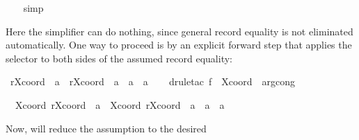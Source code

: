\begin{isabellebody}
%
\isadelimproof
\ \ %
\endisadelimproof
%
\isatagproof
{}\isamarkupfalse%
\ simp{}\isanewline
\ \ \isamarkupfalse%
%
\endisatagproof
{\isafoldproof}%
%
\isadelimproof
%
\endisadelimproof
%
\begin{isamarkuptext}%
\noindent
  Here the simplifier can do nothing, since general record equality is
  not eliminated automatically.  One way to proceed is by an explicit
  forward step that applies the selector  to both sides
  of the assumed record equality:%
\end{isamarkuptext}%
\isamarkuptrue%
\isamarkupfalse%
\ {}r{}Xcoord\ {}{}\ a{}\ {}\ r{}Xcoord\ {}{}\ a{}{}\ {}\ a\ {}\ a{}{}\isanewline
%
\isadelimproof
\ \ %
\endisadelimproof
%
\isatagproof
{}\isamarkupfalse%
\ {}drule{}tac\ f\ {}\ Xcoord\ \ arg{}cong{}%
\begin{isamarkuptxt}%
\begin{isabelle}%
\ {}{}\ Xcoord\ {}r{}Xcoord\ {}{}\ a{}{}\ {}\ Xcoord\ {}r{}Xcoord\ {}{}\ a{}{}{}\ {}\ a\ {}\ a{}%
\end{isabelle}
    Now,  will reduce the assumption to the desired

\end{isamarkuptxt}
\end{isabellebody}
